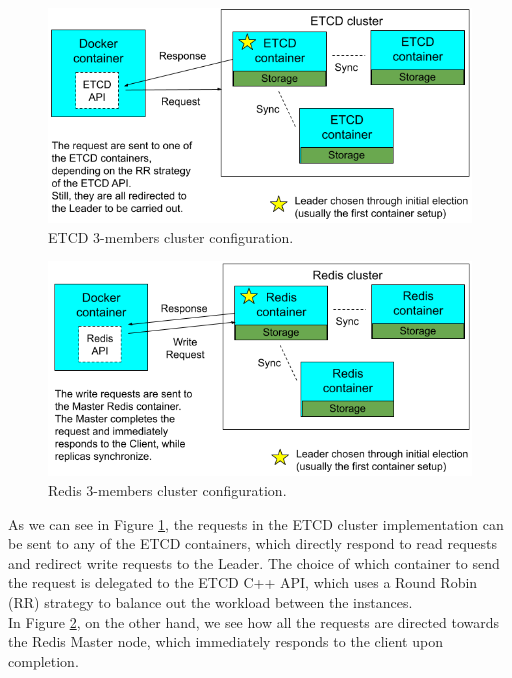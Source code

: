 \begin{figure}[h!]
	\centering
	\includegraphics[width=0.8\linewidth]{"immagini/Software development/ETCD cluster"}
	\caption[ETCD 3-members cluster configuration.]{ETCD 3-members cluster configuration.}
	\label{fig:etcd-cluster}
\end{figure}
\begin{figure}[h!]
	\centering
	\includegraphics[width=0.8\linewidth]{"immagini/Software development/Redis cluster"}
	\caption[Redis 3-members cluster configuration.]{Redis 3-members cluster configuration.}
	\label{fig:redis-cluster}
\end{figure}
As we can see in Figure \ref{fig:etcd-cluster}, the requests in the ETCD cluster implementation can be sent to any of the ETCD containers, which directly respond to read requests and redirect write requests to the Leader. The choice of which container to send the request is delegated to the ETCD C++ API, which uses a Round Robin (RR) strategy to balance out the workload between the instances. \\
In Figure \ref{fig:redis-cluster}, on the other hand, we see how all the requests are directed towards the Redis Master node, which immediately responds to the client upon completion.

